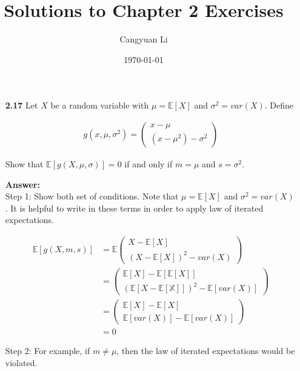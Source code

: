 \documentclass[14pt]{extreport}
\title{Solutions to Chapter 2 Exercises}
\author{Cangyuan Li}
\date{\today}
\newcommand{\answer}[0]{\medskip \textbf{Answer:} \medskip \\}
\begin{document}
\maketitle

\begin{enumerate}
    \item [\textbf{2.17}] 
    Let \(X\) be a random variable with \(\mu = \mathbb{E}[X]\) and \(\sigma^2 = var(X)\). 
    Define

    \begin{align*}
        g(x, \mu, \sigma^2) = \begin{pmatrix}
            x - \mu \\
            (x - \mu^2) - \sigma^2
        \end{pmatrix}
    \end{align*}

    Show that \(\mathbb{E}[g(X, \mu, \sigma)] = 0\) if and only if \(m = \mu\) and \(s = \sigma^2\).

    \answer
    Step 1: Show both set of conditions. Note that \(\mu = \mathbb{E}[X]\) and \(\sigma^2 = var(X)\).
    It is helpful to write in these terms in order to apply law of iterated expectations.

    \begin{align*}
        \mathbb{E}[g(X, m, s)] &= \mathbb{E}
            \begin{pmatrix}
                X - \mathbb{E}[X] \\
                (X - \mathbb{E}[X])^2 - var(X)
            \end{pmatrix} \\
            &= \begin{pmatrix}
                \mathbb{E}[X] - \mathbb{E}[\mathbb{E}[X]] \\
                (\mathbb{E}[X - \mathbb{E[X]}])^2 - \mathbb{E}[var(X)]
            \end{pmatrix} \\
            &= \begin{pmatrix}
                \mathbb{E}[X] - \mathbb{E}[X] \\
                \mathbb{E}[var(X)] - \mathbb{E}[var(X)]
            \end{pmatrix} \\
            &= 0
    \end{align*}

    Step 2:
    \medskip
    For example, if \(m \neq \mu\), then the law of iterated expectations would be violated.
\end{enumerate}
\end{document}
